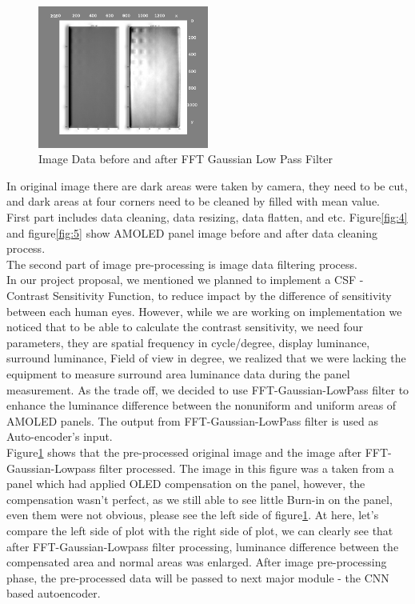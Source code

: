 \documentclass[runningheads]{llncs}
\begin{document}
\begin{figure}
    \centering
    \includegraphics[width=0.5\textwidth]{surface_plot_fft_lowpass.png}
    \caption{Image Data before and after FFT Gaussian Low Pass Filter}
    \label{fig:6}
\end{figure}
In original image there are dark areas were taken by camera, they need to be cut, and dark areas at four corners need to be cleaned by filled with mean value.\\
First part includes data cleaning, data resizing, data flatten, and etc. Figure\ref{fig:4} and figure\ref{fig:5} show AMOLED panel image before and after data cleaning process.\\


The second part of image pre-processing is image data filtering process. \\
In our project proposal, we mentioned we planned to implement a CSF - Contrast Sensitivity Function, to reduce impact by the difference of sensitivity between each human eyes. However, while we are working on implementation we noticed that to be able to calculate the contrast sensitivity, we need four parameters, they are spatial frequency in cycle/degree, display luminance, surround luminance, Field of view in degree, we realized that we were lacking the equipment to measure surround area luminance data during the panel measurement. As the trade off, we decided to use FFT-Gaussian-LowPass filter to enhance the luminance difference between the nonuniform and uniform areas of AMOLED panels. The output from FFT-Gaussian-LowPass filter is used as Auto-encoder's input. \\
Figure\ref{fig:6} shows that the pre-processed original image and the image after FFT-Gaussian-Lowpass filter processed. The image in this figure was a taken from a panel which had applied OLED compensation on the panel, however, the compensation wasn't perfect, as we still able to see little Burn-in on the panel, even them were not obvious, please see the left side of figure\ref{fig:6}. At here, let's compare the left side of plot with the right side of plot, we can clearly see that after FFT-Gaussian-Lowpass filter processing, luminance difference between the compensated area and normal areas was enlarged.
After image pre-processing phase, the pre-processed data will be passed to next major module - the CNN based autoencoder.
\end{document}
